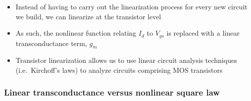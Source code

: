 \documentclass[11pt]{article}
\providecommand{\tightlist}{%
      \setlength{\itemsep}{0pt}\setlength{\parskip}{0pt}}
\begin{document}
    \begin{itemize}
\tightlist
\item
  Instead of having to carry out the linearization process for every new
  circuit we build, we can linearize at the transistor level
\item
  As such, the nonlinear function relating \(I_d\) to \(V_{gs}\) is
  replaced with a linear transconductance term, \(g_m\)
\item
  Transistor linearization allows us to use linear circuit analysis
  techniques (i.e.~Kirchoff's laws) to analyze circuits comprising MOS
  transistors
\end{itemize}

    \hypertarget{linear-transconductance-versus-nonlinear-square-law}{%
\subsubsection{Linear transconductance versus nonlinear square
law}\label{linear-transconductance-versus-nonlinear-square-law}}
\end{document}
